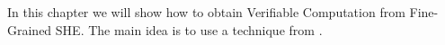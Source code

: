 In this chapter we will show how to obtain Verifiable Computation from Fine-Grained SHE. 
The main idea is to use a technique from \cite{ckv10}.


